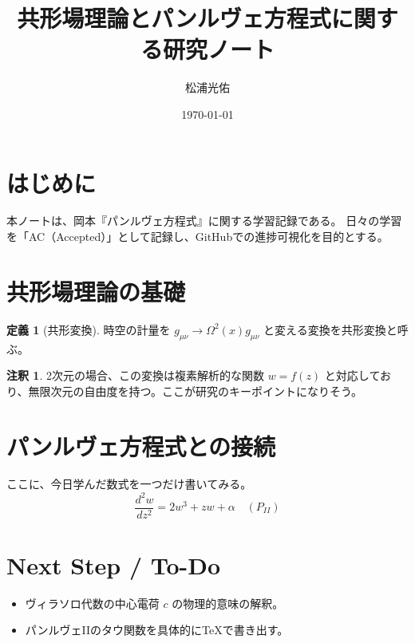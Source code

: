 \documentclass[paper=a4, fontsize=11pt]{jlreq} %
\title{共形場理論とパンルヴェ方程式に関する研究ノート}
\author{松浦光佑}
\date{\today}
\theoremstyle{definition}
\newtheorem{definition}[theorem]{定義}
\newtheorem{remark}[theorem]{注釈}
\begin{document}
\maketitle
\tableofcontents %

\section{はじめに}
本ノートは、岡本『パンルヴェ方程式』に関する学習記録である。
日々の学習を「AC（Accepted）」として記録し、GitHubでの進捗可視化を目的とする。

\section{共形場理論の基礎}
\begin{definition}[共形変換]
    時空の計量を $g_{\mu\nu} \to \Omega^2(x) g_{\mu\nu}$ と変える変換を共形変換と呼ぶ。
\end{definition}

\begin{remark}
    2次元の場合、この変換は複素解析的な関数 $w = f(z)$ と対応しており、無限次元の自由度を持つ。ここが研究のキーポイントになりそう。
\end{remark}

\section{パンルヴェ方程式との接続}
ここに、今日学んだ数式を一つだけ書いてみる。
\begin{equation}
    \frac{d^2 w}{dz^2} = 2w^3 + zw + \alpha \quad (P_{II})
\end{equation}

\section{Next Step / To-Do}
\begin{itemize}
    \item [ ] ヴィラソロ代数の中心電荷 $c$ の物理的意味の解釈。
    \item [ ] パンルヴェIIのタウ関数を具体的にTeXで書き出す。
\end{itemize}
\end{document}
